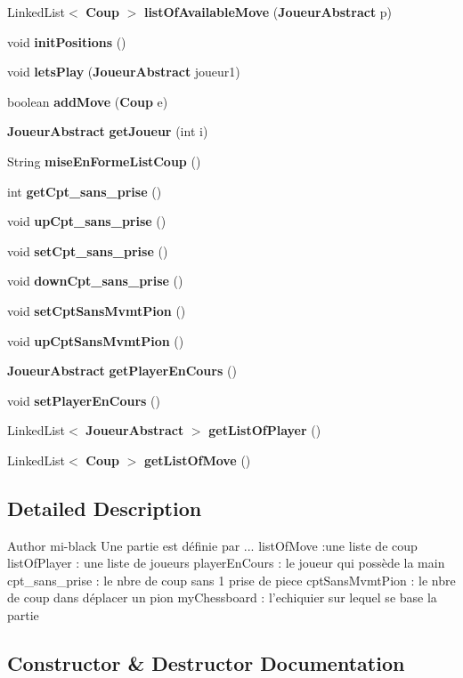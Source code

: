 \begin{DoxyCompactItemize}
Linked\-List$<$ {\bf Coup} $>$ {\bf list\-Of\-Available\-Move} ({\bf Joueur\-Abstract} p)
\item 
void {\bf init\-Positions} ()
\item 
void {\bf lets\-Play} ({\bf Joueur\-Abstract} joueur1)
\item 
boolean {\bf add\-Move} ({\bf Coup} e)
\item 
{\bf Joueur\-Abstract} {\bf get\-Joueur} (int i)
\item 
String {\bf mise\-En\-Forme\-List\-Coup} ()
\item 
int {\bf get\-Cpt\-\_\-sans\-\_\-prise} ()
\item 
void {\bf up\-Cpt\-\_\-sans\-\_\-prise} ()
\item 
void {\bf set\-Cpt\-\_\-sans\-\_\-prise} ()
\item 
void {\bf down\-Cpt\-\_\-sans\-\_\-prise} ()
\item 
void {\bf set\-Cpt\-Sans\-Mvmt\-Pion} ()
\item 
void {\bf up\-Cpt\-Sans\-Mvmt\-Pion} ()
\item 
{\bf Joueur\-Abstract} {\bf get\-Player\-En\-Cours} ()
\item 
void {\bf set\-Player\-En\-Cours} ()
\item 
Linked\-List$<$ {\bf Joueur\-Abstract} $>$ {\bf get\-List\-Of\-Player} ()
\item 
Linked\-List$<$ {\bf Coup} $>$ {\bf get\-List\-Of\-Move} ()
\end{DoxyCompactItemize}


\subsection{Detailed Description}
\begin{DoxyAuthor}{Author}
mi-\/black Une partie est définie par ... list\-Of\-Move \-:une liste de coup list\-Of\-Player \-: une liste de joueurs player\-En\-Cours \-: le joueur qui possède la main cpt\-\_\-sans\-\_\-prise \-: le nbre de coup sans 1 prise de piece cpt\-Sans\-Mvmt\-Pion \-: le nbre de coup dans déplacer un pion my\-Chessboard \-: l'echiquier sur lequel se base la partie 
\end{DoxyAuthor}


\subsection{Constructor \& Destructor Documentation}
